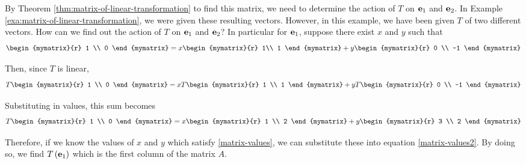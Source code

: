\begin{solution} By Theorem \ref{thm:matrix-of-linear-transformation} to find this matrix, we need to determine the action of $T$ on
$\mbox{\bf e}_{1}$ and $\mbox{\bf e}_{2}$. In Example \ref{exa:matrix-of-linear-transformation}, we were given these resulting vectors.
However, in this example, we have been given $T$ of two different vectors. How can we find out the action
of $T$ on $\mbox{\bf e}_{1}$ and $\mbox{\bf e}_{2}$? In particular for $\mbox{\bf e}_{1}$, suppose there exist $x$ and $y$ such that
\begin{equation}
\begin{mymatrix}{r}
1 \\
0
\end{mymatrix} = x\begin{mymatrix}{r}
1\\
1
\end{mymatrix} +y\begin{mymatrix}{r}
0 \\
-1 
\end{mymatrix} 
\label{matrix-values}
\end{equation}

Then, since $T$ is linear,
\begin{equation*}
T\begin{mymatrix}{r}
1 \\
0 
\end{mymatrix}  = x T\begin{mymatrix}{r}
1 \\
1
\end{mymatrix} +y T\begin{mymatrix}{r}
0 \\
-1 
\end{mymatrix}
\end{equation*}

Substituting in values, this sum becomes
\begin{equation}
T\begin{mymatrix}{r}
1 \\
0 
\end{mymatrix} = 
 x\begin{mymatrix}{r}
1 \\
2
\end{mymatrix} +y\begin{mymatrix}{r}
3 \\
2
\end{mymatrix} 
\label{matrix-values2}
\end{equation}

Therefore, if we know the values of $x$ and $y$ which satisfy \ref{matrix-values}, we can substitute these into equation \ref{matrix-values2}. By doing so,
we find $T\left(\mbox{\bf e}_1\right)$ which is the first column of the matrix $A$. 


\end{solution}

